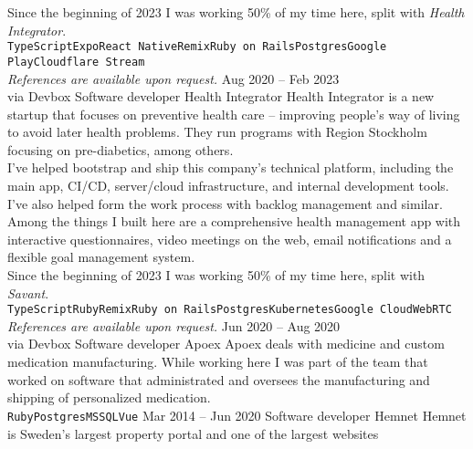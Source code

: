 \documentclass[9pt]{developercv} %
\begin{document}
\begin{entrylist}
{    Since the beginning of 2023 I was working 50\% of my time here, split with
    \textit{Health Integrator}.\\
      \texttt{TypeScript}\slashsep\texttt{Expo}\slashsep\texttt{React
      Native}\slashsep\texttt{Remix}\slashsep\texttt{Ruby on
      Rails}\slashsep\texttt{Postgres}\slashsep\texttt{Google
      Play}\slashsep\texttt{Cloudflare Stream}\\
    \textit{References are available upon request.}
    }
  \entry
    {Aug 2020 -- Feb 2023\\\footnotesize{via Devbox}}
    {Software developer}
    {Health Integrator}
    {Health Integrator is a new startup that focuses on preventive health care
    -- improving people's way of living to avoid later health problems. They
    run programs with Region Stockholm focusing on pre-diabetics, among
    others.\\ I've helped bootstrap and ship this company's technical platform,
    including the main app, CI/CD, server/cloud infrastructure, and internal
    development tools. I've also helped form the work process with backlog
    management and similar.\\
    Among the things I built here are a comprehensive health management app with
    interactive questionnaires, video meetings on the web, email notifications
    and a flexible goal management system.\\
    Since the beginning of 2023 I was working 50\% of my time here, split with
    \textit{Savant}.\\
      \texttt{TypeScript}\slashsep\texttt{Ruby}\slashsep\texttt{Remix}\slashsep\texttt{Ruby
      on
      Rails}\slashsep\texttt{Postgres}\slashsep\texttt{Kubernetes}\slashsep\texttt{Google
      Cloud}\slashsep\texttt{WebRTC}\\
    \textit{References are available upon request.}
    }
  \entry
    {Jun 2020 -- Aug 2020\\\footnotesize{via Devbox}}
    {Software developer}
    {Apoex}
    {Apoex deals with medicine and custom medication manufacturing. While
      working here I was part of the team that worked on software that
      administrated and oversees the manufacturing and shipping of personalized
      medication.\\
      \texttt{Ruby}\slashsep\texttt{Postgres}\slashsep\texttt{MSSQL}\slashsep\texttt{Vue}}
  \entry
    {Mar 2014 -- Jun 2020}
    {Software developer}
    {Hemnet}
    {Hemnet is Sweden's largest property portal and one of the largest websites
}
\end{entrylist}
\end{document}
